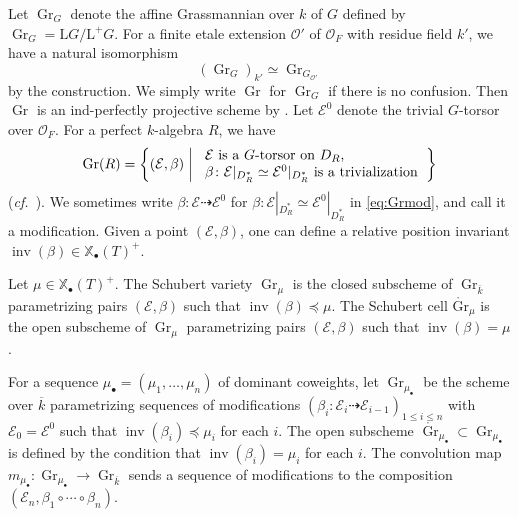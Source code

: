 \documentclass[12pt,a4paper]{article}
\DeclareMathOperator{\Gr}{Gr}
\DeclareMathOperator{\inv}{inv}
\newcommand{\bX}{\mathbb{X}}
\newcommand{\cE}{\mathcal{E}}
\newcommand{\cO}{\mathcal{O}}
\newcommand{\rL}{\mathrm{L}}
\newcommand{\ol}{\overline}
\newcommand{\relmiddle}[1]{\mathrel{}\middle#1\mathrel{}}
\newcommand{\cf}{\textit{cf.\ }}
\begin{document}
Let $\Gr_G$ denote the affine Grassmannian over $k$ of $G$ 
defined by $\Gr_G = \rL G/\rL^+ G$. 
For a finite etale extension $\cO'$ of $\cO_F$ with residue field $k'$, 
we have a natural isomorphism 
\begin{equation}\label{eq:Grbc}
 (\Gr_G)_{k'} \simeq \Gr_{G_{\cO'}} 
\end{equation}
by the construction. 
We simply write $\Gr$ for $\Gr_G$ if there is no confusion. 
Then $\Gr$ is an ind-perfectly projective scheme 
by \cite[Corollary 9.6]{BhScProWG}. 
Let $\cE^0$ denote the trivial $G$-torsor over $\cO_F$. 
For a perfect $k$-algebra $R$, we have 
\begin{equation}\label{eq:Grmod}
 \Gr(R) =  \left\{ 
 (\cE, \beta) \relmiddle{|} 
 \begin{tabular}{ l }
  $\cE$ is a $G$-torsor on $D_R$,  \\ 
  $\beta \colon \cE|_{D^*_R} \simeq \cE^0|_{D^*_R}$ is a trivialization 
  \end{tabular} 
\right\}    
\end{equation}
(\cf \cite[Lemma 1.3]{ZhuAffGmix}). 
We sometimes write $\beta \colon \cE \dashrightarrow \cE^0$ for 
$\beta \colon \cE|_{D^*_R} \simeq \cE^0|_{D^*_R}$ in \eqref{eq:Grmod}, 
and call it a modification.  
Given a point $(\cE, \beta)$, one can define a relative position invariant $\inv (\beta) \in \bX_{\bullet}( T)^+$. 


Let $\mu \in \bX_{\bullet}( T)^+$. 
The Schubert variety $\Gr_{\mu}$ 
is the closed subscheme of $\Gr_{\ol{k}}$ 
parametrizing pairs $(\cE, \beta)$ such that 
$\inv (\beta) \preceq \mu$. 
The Schubert cell $\mathring{\mathrm{Gr}}_{\mu}$ 
is the open subscheme of $\Gr_{\mu}$ 
parametrizing pairs $(\cE, \beta)$ such that 
$\inv (\beta) = \mu$. 

For a sequence $\mu_{\bullet} =(\mu_1, \ldots, \mu_n)$ of dominant coweights, let $\Gr_{\mu_{\bullet}}$  be the scheme over $\ol{k}$ parametrizing sequences of modifications 
$( \beta_i \colon \cE_i \dashrightarrow \cE_{i-1})_{1 \leq i \leq n}$ with 
$\cE_0=\cE^0$ 
such that $\inv (\beta_i) \preceq \mu_i$ for each $i$. 
The open subscheme 
$\mathring{\Gr}_{\mu_{\bullet} } \subset \Gr_{\mu_{\bullet} }$ 
is defined by the condition that 
$\inv (\beta_i) = \mu_i$ for each $i$. 
The convolution map $m_{\mu_{\bullet}} \colon \Gr_{\mu_{\bullet}} \rightarrow \Gr_{\ol{k}}$ sends a sequence of modifications to the composition $(\cE_n, \beta_1 \circ \cdots \circ \beta_n)$. 
\end{document}
